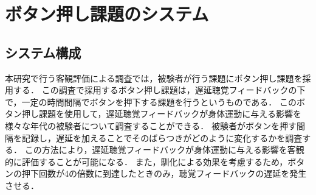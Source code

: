 \section{ボタン押し課題のシステム}
\subsection{システム構成}
本研究で行う客観評価による調査では，被験者が行う課題にボタン押し課題を採用する．
この調査で採用するボタン押し課題は，遅延聴覚フィードバックの下で，一定の時間間隔でボタンを押下する課題を行うというものである．
このボタン押し課題を使用して，遅延聴覚フィードバックが身体運動に与える影響を様々な年代の被験者について調査することができる．
被験者がボタンを押す間隔を記録し，遅延を加えることでそのばらつきがどのように変化するかを調査する．
この方法により，遅延聴覚フィードバックが身体運動に与える影響を客観的に評価することが可能になる．
また，馴化による効果を考慮するため，ボタンの押下回数が4の倍数に到達したときのみ，聴覚フィードバックの遅延を発生させる．
